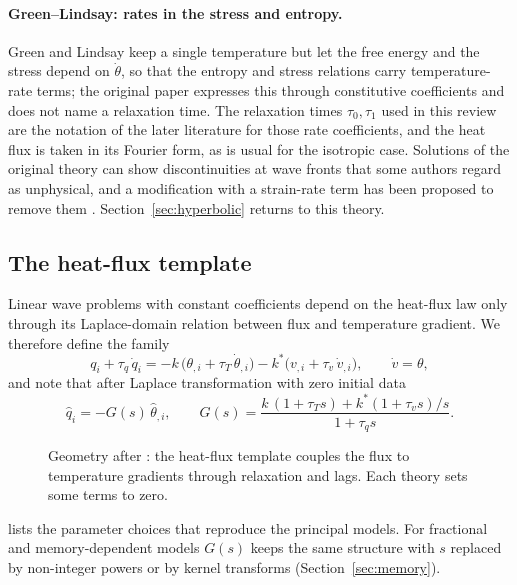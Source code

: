 \paragraph{Green--Lindsay: rates in the stress and entropy.} Green and Lindsay \citep{Green1972} keep a single temperature but let the free energy and the stress depend on $\dot\theta$, so that the entropy and stress relations carry temperature-rate terms; the original paper expresses this through constitutive coefficients and does not name a relaxation time. The relaxation times $\tau_0,\tau_1$ used in this review are the notation of the later literature for those rate coefficients, and the heat flux is taken in its Fourier form, as is usual for the isotropic case. Solutions of the original theory can show discontinuities at wave fronts that some authors regard as unphysical, and a modification with a strain-rate term has been proposed to remove them \citep{Yu2018ModifiedGL}. Section~\ref{sec:hyperbolic} returns to this theory.

\subsection{The heat-flux template}\label{sec:framework-link}
Linear wave problems with constant coefficients depend on the heat-flux law only through its Laplace-domain relation between flux and temperature gradient. We therefore define the family
\begin{equation}
q_i+\tau_q\,\dot q_i=-k\,\bigl(\theta_{,i}+\tau_T\,\dot\theta_{,i}\bigr)-k^{*}\bigl(v_{,i}+\tau_v\,\dot v_{,i}\bigr),\qquad \dot v=\theta,\label{eq:template}
\end{equation}
and note that after Laplace transformation with zero initial data
\begin{equation}
\hat q_i=-G(s)\,\hat\theta_{,i},\qquad
G(s)=\frac{k\,(1+\tau_Ts)+k^{*}(1+\tau_vs)/s}{1+\tau_qs}.\label{eq:G}
\end{equation}

\begin{figure}[t!]\centering\small

\caption{Geometry after \citep{Biot1956}: the heat-flux template couples the flux to temperature gradients through relaxation and lags. Each theory sets some terms to zero.}\label{fig:template}
\end{figure}

 lists the parameter choices that reproduce the principal models. For fractional and memory-dependent models $G(s)$ keeps the same structure with $s$ replaced by non-integer powers or by kernel transforms (Section~\ref{sec:memory}).

